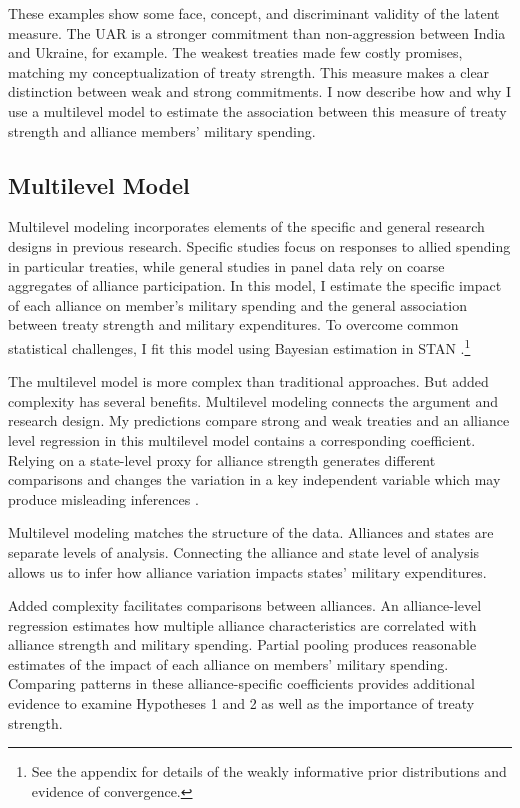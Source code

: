 \documentclass[12pt]{article}
\begin{document}
These examples show some face, concept, and discriminant validity of the latent measure. 
The UAR is a stronger commitment than non-aggression between India and Ukraine, for example. 
The weakest treaties made few costly promises, matching my conceptualization of treaty strength. 
This measure makes a clear distinction between weak and strong commitments. 
I now describe how and why I use a multilevel model to estimate the association between this measure of treaty strength and alliance members' military spending.  


\subsection{Multilevel Model} 


Multilevel modeling incorporates elements of the specific and general research designs in previous research. 
Specific studies focus on responses to allied spending in particular treaties, while general studies in panel data rely on coarse aggregates of alliance participation.
In this model, I estimate the specific impact of each alliance on member's military spending and the general association between treaty strength and military expenditures. 
To overcome common statistical challenges, I fit this model using Bayesian estimation in STAN \citep{Carpenteretal2016}.\footnote{See the appendix for details of the weakly informative prior distributions and evidence of convergence.}


The multilevel model is more complex than traditional approaches. 
But added complexity has several benefits. 
Multilevel modeling connects the argument and research design. 
My predictions compare strong and weak treaties and an alliance level regression in this multilevel model contains a corresponding coefficient.
Relying on a state-level proxy for alliance strength generates different comparisons and changes the variation in a key independent variable which may produce misleading inferences \citep{McElreath2016}. 


Multilevel modeling matches the structure of the data.
Alliances and states are separate levels of analysis. 
Connecting the alliance and state level of analysis allows us to infer how alliance variation impacts states' military expenditures. 


Added complexity facilitates comparisons between alliances. 
An alliance-level regression estimates how multiple alliance characteristics are correlated with alliance strength and military spending.
Partial pooling produces reasonable estimates of the impact of each alliance on members' military spending. 
Comparing patterns in these alliance-specific coefficients provides additional evidence to examine Hypotheses 1 and 2 as well as the importance of treaty strength. 
\end{document}
